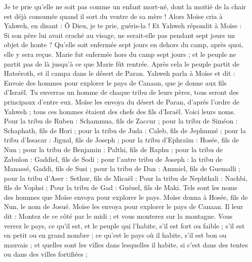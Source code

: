 \begin{multicols}{2}
Je te prie qu'elle ne soit pas comme un enfant mort-né, dont la moitié de la chair est déjà consumée quand il sort du ventre de sa mère !
Alors Moïse cria à Yahweh, en disant : Ô Dieu, je te prie, guéris-la !
Et Yahweh répondit à Moïse : Si son père lui avait craché au visage, ne serait-elle pas pendant sept jours un objet de honte ? Qu'elle soit enfermée sept jours en dehors du camp, après quoi, elle y sera reçue.
Marie fut enfermée hors du camp sept jours ; et le peuple ne partit pas de là jusqu'à ce que Marie fût rentrée.
Après cela le peuple partit de Hatséroth, et il campa dans le désert de Paran.
\VerseOne{}Yahweh parla à Moïse et dit :
Envoie des hommes pour explorer le pays de Canaan, que je donne aux fils d'Israël. Tu enverras un homme de chaque tribu de leurs pères, tous seront des principaux d'entre eux.
Moïse les envoya du désert de Paran, d’après l’ordre de Yahweh ; tous ces hommes étaient des chefs des fils d'Israël.
Voici leurs noms. Pour la tribu de Ruben : Schammua, fils de Zaccur ;
pour la tribu de Siméon : Schaphath, fils de Hori ;
pour la tribu de Juda : Caleb, fils de Jephunné ;
pour la tribu d'Issacar : Jigual, fils de Joseph ;
pour la tribu d'Ephraïm : Hosée, fils de Nun ;
pour la tribu de Benjamin : Palthi, fils de Raphu ;
pour la tribu de Zabulon : Gaddiel, fils de Sodi ;
pour l’autre tribu de Joseph : la tribu de Manassé, Gaddi, fils de Susi ;
pour la tribu de Dan : Ammiel, fils de Guemalli ;
pour la tribu d'Aser : Sethur, fils de Micaël ;
Pour la tribu de Nephthali : Nachbi, fils de Vophsi ;
Pour la tribu de Gad : Guéuel, fils de Maki.
Tels sont les noms des hommes que Moïse envoya pour explorer le pays. Moïse donna à Hosée, fils de Nun, le nom de Josué.
Moïse les envoya pour explorer le pays de Canaan. Il leur dit : Montez de ce côté par le midi ; et vous monterez sur la montagne.
Vous verrez le pays, ce qu’il est, et le peuple qui l'habite, s'il est fort ou faible ; s'il est en petit ou en grand nombre ;
ce qu’est le pays où il habite, s'il est bon ou mauvais ; et quelles sont les villes dans lesquelles il habite, si c'est dans des tentes ou dans des villes fortifiées ;

\end{multicols}
